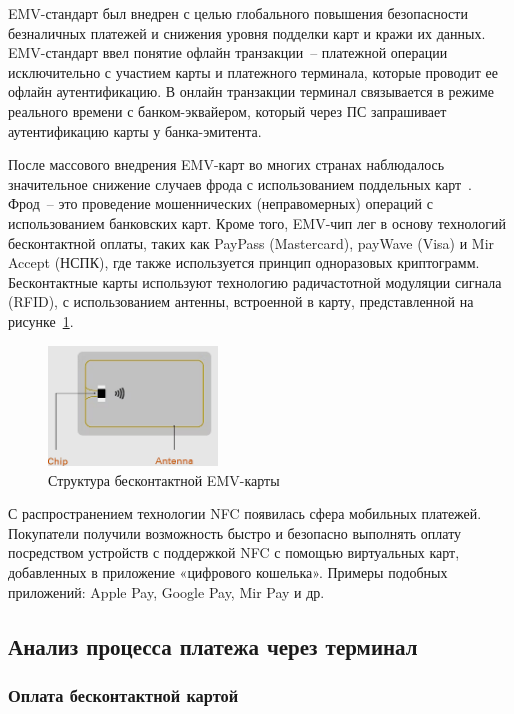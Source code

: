 EMV-стандарт был внедрен с целью глобального повышения безопасности безналичных платежей и снижения уровня подделки карт и кражи их данных.
EMV-стандарт ввел понятие офлайн транзакции~-- платежной операции исключительно с участием карты и платежного терминала, которые проводит ее офлайн аутентификацию.
В онлайн транзакции терминал связывается в режиме реального времени с банком-эквайером, который через ПС запрашивает аутентификацию карты у банка-эмитента.

После массового внедрения EMV-карт во многих странах наблюдалось значительное снижение случаев фрода с использованием поддельных карт~\cite{plas_emv_fraud}.
Фрод~-- это проведение мошеннических (неправомерных) операций с использованием банковских карт.
Кроме того, EMV-чип лег в основу технологий бесконтактной оплаты, таких как PayPass (Mastercard), payWave (Visa) и Mir Accept (НСПК), где также используется принцип одноразовых криптограмм.
Бесконтактные карты используют технологию радичастотной модуляции сигнала (RFID), с использованием антенны, встроенной в карту, представленной на рисунке~\ref{fig:emv_card}.

\begin{figure}[H]
    \centering
    \includegraphics[width=0.4\textwidth]{images/research/emv_card}
    \caption{\centering Структура бесконтактной EMV-карты}
    \label{fig:emv_card}
\end{figure}

С распространением технологии NFC появилась сфера мобильных платежей.
Покупатели получили возможность быстро и безопасно выполнять оплату посредством устройств с поддержкой NFC с помощью виртуальных карт, добавленных в приложение «цифрового кошелька».
Примеры подобных приложений: Apple Pay, Google Pay, Mir Pay и др.



\subsection{Анализ процесса платежа через терминал}
\label{subsec:payment_process}

\subsubsection{Оплата бесконтактной картой}
\label{subsubsec:contactless_payment}

